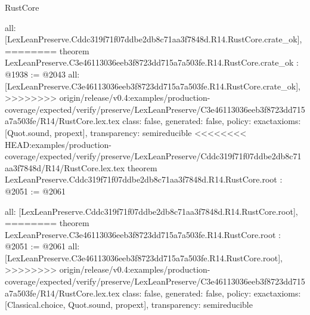 \begin{lexlean}{RustCore}
\begin{coremodule}
{\begin{coremodule}
{{{{{{  all: [LexLeanPreserve.Cddc319f71f07ddbe2db8c71aa3f7848d.R14.RustCore.crate_ok],
========
theorem LexLeanPreserve.C3e46113036eeb3f8723dd715a7a503fe.R14.RustCore.crate_ok : @1938 := @2043 {
  all: [LexLeanPreserve.C3e46113036eeb3f8723dd715a7a503fe.R14.RustCore.crate_ok],
>>>>>>>> origin/release/v0.4:examples/production-coverage/expected/verify/preserve/LexLeanPreserve/C3e46113036eeb3f8723dd715a7a503fe/R14/RustCore.lex.tex
  class: false,
  generated: false,
  policy: exact{axioms: [Quot.sound, propext]},
  transparency: semireducible
}
<<<<<<<< HEAD:examples/production-coverage/expected/verify/preserve/LexLeanPreserve/Cddc319f71f07ddbe2db8c71aa3f7848d/R14/RustCore.lex.tex
theorem LexLeanPreserve.Cddc319f71f07ddbe2db8c71aa3f7848d.R14.RustCore.root : @2051 := @2061 {
  all: [LexLeanPreserve.Cddc319f71f07ddbe2db8c71aa3f7848d.R14.RustCore.root],
========
theorem LexLeanPreserve.C3e46113036eeb3f8723dd715a7a503fe.R14.RustCore.root : @2051 := @2061 {
  all: [LexLeanPreserve.C3e46113036eeb3f8723dd715a7a503fe.R14.RustCore.root],
>>>>>>>> origin/release/v0.4:examples/production-coverage/expected/verify/preserve/LexLeanPreserve/C3e46113036eeb3f8723dd715a7a503fe/R14/RustCore.lex.tex
  class: false,
  generated: false,
  policy: exact{axioms: [Classical.choice, Quot.sound, propext]},
  transparency: semireducible
}

}}}}}}}
\end{coremodule}}
\end{coremodule}
\end{lexlean}

